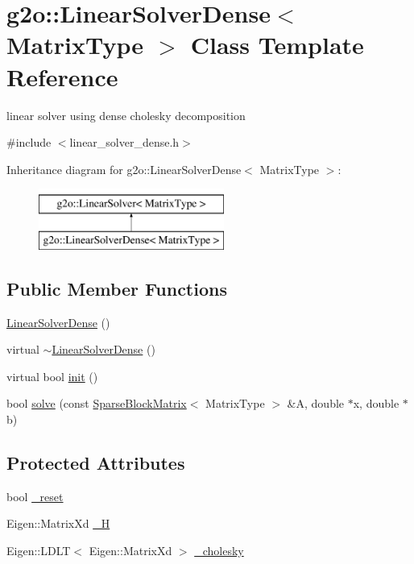 \hypertarget{classg2o_1_1_linear_solver_dense}{}\section{g2o\+:\+:Linear\+Solver\+Dense$<$ Matrix\+Type $>$ Class Template Reference}
\label{classg2o_1_1_linear_solver_dense}


linear solver using dense cholesky decomposition  




{\ttfamily \#include $<$linear\+\_\+solver\+\_\+dense.\+h$>$}

Inheritance diagram for g2o\+:\+:Linear\+Solver\+Dense$<$ Matrix\+Type $>$\+:\begin{figure}[H]
\begin{center}
\leavevmode
\includegraphics[height=2.000000cm]{classg2o_1_1_linear_solver_dense}
\end{center}
\end{figure}
\subsection*{Public Member Functions}
\begin{DoxyCompactItemize}
\item 
\mbox{\hyperlink{classg2o_1_1_linear_solver_dense_a25d8767ad60e944d8518348a136830da}{Linear\+Solver\+Dense}} ()
\item 
virtual \mbox{\hyperlink{classg2o_1_1_linear_solver_dense_a2b3cbb77fa958bf322b98e38ec3e29c2}{$\sim$\+Linear\+Solver\+Dense}} ()
\item 
virtual bool \mbox{\hyperlink{classg2o_1_1_linear_solver_dense_a24f68ecd4b022269dbfc4d990eb5c57b}{init}} ()
\item 
bool \mbox{\hyperlink{classg2o_1_1_linear_solver_dense_a8b6eafa6e53b9f705a4e8eb436eeb403}{solve}} (const \mbox{\hyperlink{classg2o_1_1_sparse_block_matrix}{Sparse\+Block\+Matrix}}$<$ Matrix\+Type $>$ \&A, double $\ast$x, double $\ast$b)
\end{DoxyCompactItemize}
\subsection*{Protected Attributes}
\begin{DoxyCompactItemize}
\item 
bool \mbox{\hyperlink{classg2o_1_1_linear_solver_dense_a2d82ac52c9c24501cccee3ef3cb575fe}{\+\_\+reset}}
\item 
Eigen\+::\+Matrix\+Xd \mbox{\hyperlink{classg2o_1_1_linear_solver_dense_a5ca6a1f2358ce0620dbdbae3fdc9fc99}{\+\_\+H}}
\item 
Eigen\+::\+L\+D\+LT$<$ Eigen\+::\+Matrix\+Xd $>$ \mbox{\hyperlink{classg2o_1_1_linear_solver_dense_a20fc35e2f25107a6e36211861034aae0}{\+\_\+cholesky}}
\end{DoxyCompactItemize}


